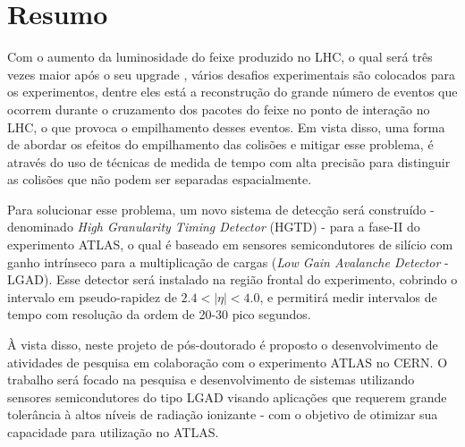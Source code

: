 \chapter*{Resumo}


Com o aumento da luminosidade do feixe produzido no LHC, o qual será três vezes maior após o seu upgrade \cite{HL_LHC,tdr}, vários desafios experimentais são colocados para os experimentos, dentre eles está a reconstrução do grande número de eventos que ocorrem durante o cruzamento dos pacotes do feixe no ponto de interação no LHC, o que provoca o empilhamento desses eventos.
Em vista disso, uma forma de abordar os efeitos do empilhamento das colisões e mitigar esse problema, é através do uso de técnicas de medida de tempo com alta precisão para distinguir as colisões que não podem ser separadas espacialmente. 

Para solucionar esse problema, um novo sistema de detecção será construído - denominado {\it High Granularity Timing Detector} (HGTD) - para a fase-II do experimento ATLAS, o qual é baseado em sensores semicondutores de silício com ganho intrínseco para a multiplicação de cargas
({\it Low Gain Avalanche Detector} - LGAD). Esse detector será instalado na região frontal do experimento, cobrindo o intervalo em pseudo-rapidez de $2.4< |\eta| <4.0$, e permitirá medir intervalos de tempo com resolução da ordem de 20-30 pico segundos.


À vista disso, neste projeto de pós-doutorado é proposto o desenvolvimento de atividades de pesquisa em colaboração com o experimento ATLAS no CERN. O trabalho será focado na pesquisa e desenvolvimento de sistemas utilizando sensores semicondutores do tipo LGAD visando aplicações que requerem grande tolerância à altos níveis de radiação ionizante \cite{JIN_LGAD,NIMA_LGAD,NIMA_LGAD_I,NIMA_LGAD_II,NIMA_LGAD_III} - com o objetivo de otimizar sua capacidade para utilização no ATLAS. %

